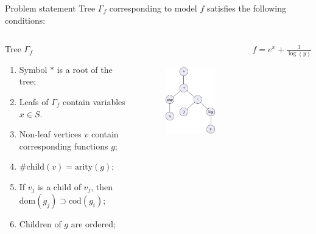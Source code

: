 \documentclass{beamer}
\begin{document}
\begin{frame}{Problem statement}
Tree $\Gamma_f$ corresponding to model $f$ satisfies the following conditions:
\begin{columns}
	\hspace{0.5cm}
	\begin{block}{Tree $\Gamma_f$}
		\begin{enumerate}
			\item Symbol $\ast$ is a root of the tree;
			\item Leafs of $\Gamma_f$ contain variables $x \in S$.
			\item Non-leaf vertices $v$ contain corresponding functions $g$;
			\item $\#\text{child} (v) = \text{arity}(g)$;
			\item If $v_j$ is a child of $v_j$, then $\text{dom}(g_j) \supset \text{cod}(g_i)$;
			\item Children of $g$ are ordered;
		\end{enumerate}
	\end{block}

	\vspace{0.5cm}
	\begin{figure}[H]
		\includegraphics[height=5cm]{fig/new_tree.pdf}
	\end{figure}
	\hspace{1.7cm} $f = e^x+ \frac{3}{\log(y)}$
\end{columns}
\end{frame}
\end{document}
